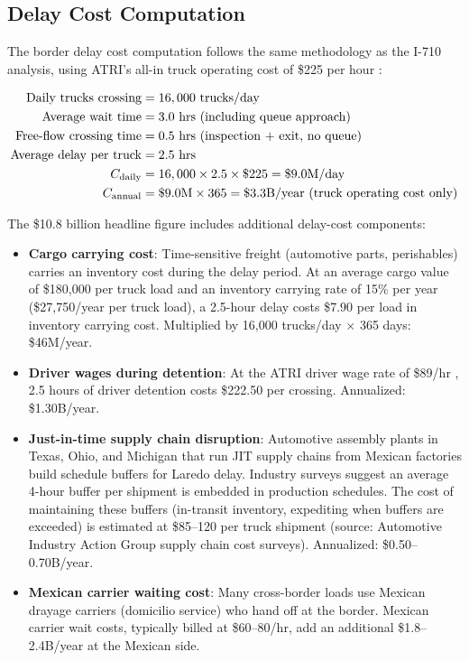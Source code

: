 \subsection{Delay Cost Computation}

The border delay cost computation follows the same methodology as the I-710 analysis, using ATRI's all-in truck operating cost of \$225 per hour \citep{ATRI_costs2024}:

\begin{align}
  \text{Daily trucks crossing} &= 16,000 \text{ trucks/day} \notag \\
  \text{Average wait time} &= 3.0 \text{ hrs (including queue approach)} \notag \\
  \text{Free-flow crossing time} &= 0.5 \text{ hrs (inspection + exit, no queue)} \notag \\
  \text{Average delay per truck} &= 2.5 \text{ hrs} \notag \\
  C_{\text{daily}} &= 16,000 \times 2.5 \times \$225 = \$9.0 \text{M/day} \notag \\
  C_{\text{annual}} &= \$9.0 \text{M} \times 365 = \$3.3 \text{B/year (truck operating cost only)}
\end{align}

The \$10.8 billion headline figure includes additional delay-cost components:

\begin{itemize}
  \item \textbf{Cargo carrying cost}: Time-sensitive freight (automotive parts, perishables) carries an inventory cost during the delay period. At an average cargo value of \$180,000 per truck load \citep{FAF5_2023} and an inventory carrying rate of 15\% per year (\$27,750/year per truck load), a 2.5-hour delay costs \$7.90 per load in inventory carrying cost. Multiplied by 16,000 trucks/day $\times$ 365 days: \$46M/year.

  \item \textbf{Driver wages during detention}: At the ATRI driver wage rate of \$89/hr \citep{ATRI_costs2024}, 2.5 hours of driver detention costs \$222.50 per crossing. Annualized: \$1.30B/year.

  \item \textbf{Just-in-time supply chain disruption}: Automotive assembly plants in Texas, Ohio, and Michigan that run JIT supply chains from Mexican factories build schedule buffers for Laredo delay. Industry surveys suggest an average 4-hour buffer per shipment is embedded in production schedules. The cost of maintaining these buffers (in-transit inventory, expediting when buffers are exceeded) is estimated at \$85--120 per truck shipment (source: Automotive Industry Action Group supply chain cost surveys). Annualized: \$0.50--0.70B/year.

  \item \textbf{Mexican carrier waiting cost}: Many cross-border loads use Mexican drayage carriers (domicilio service) who hand off at the border. Mexican carrier wait costs, typically billed at \$60--80/hr, add an additional \$1.8--2.4B/year at the Mexican side.
\end{itemize}

